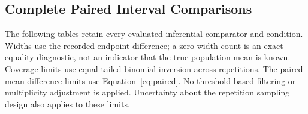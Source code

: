\documentclass{article}
\begin{document}
\subsection{Complete Paired Interval Comparisons}
\label{sec:complete}
The following tables retain every evaluated inferential comparator and condition. Widths use the recorded endpoint difference; a zero-width count is an exact equality diagnostic, not an indicator that the true population mean is known. Coverage limits use equal-tailed binomial inversion across repetitions. The paired mean-difference limits use Equation~\ref{eq:paired}. No threshold-based filtering or multiplicity adjustment is applied. Uncertainty about the repetition sampling design also applies to these limits.
\end{document}
